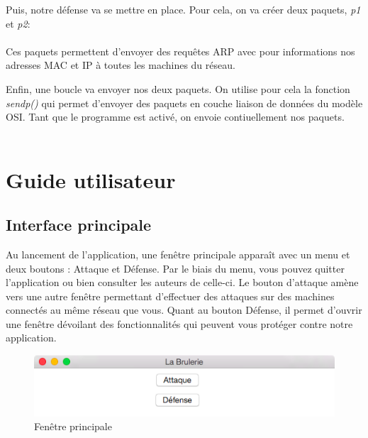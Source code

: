 \documentclass[11pt]{article}
\begin{document}
		Puis, notre défense va se mettre en place. Pour cela, on va créer deux paquets, \textit{p1} et \textit{p2}: ~\\
		~\\
		Ces paquets permettent d'envoyer des requêtes ARP avec pour informations nos adresses MAC et IP à toutes les machines du réseau.
		
		Enfin, une boucle va envoyer nos deux paquets. On utilise pour cela la fonction \textit{sendp()} qui permet d'envoyer des paquets en couche liaison de données du modèle OSI.
		Tant que le programme est activé, on envoie contiuellement nos paquets.~\\
		~\\	


\section{Guide utilisateur}
\subsection{Interface principale}
Au lancement de l'application, une fenêtre principale apparaît avec un menu et deux boutons : Attaque et Défense. Par le biais du menu, vous pouvez quitter l'application ou bien consulter les auteurs de celle-ci. Le bouton d'attaque amène vers une autre fenêtre permettant d'effectuer des attaques sur des machines connectés au même réseau que vous. Quant au bouton Défense, il permet d'ouvrir une fenêtre dévoilant des fonctionnalités qui peuvent vous protéger contre notre application.
\begin{figure}[!h]
\centering
\includegraphics[scale=0.6]{./Captures/fenetrePrinc.png}
\caption{Fenêtre principale}
\end{figure}
\end{document}
